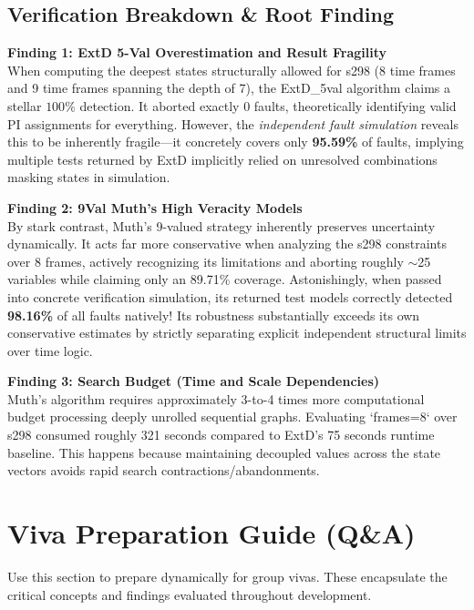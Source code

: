 \documentclass[12pt, a4paper]{article}
\begin{document}
\subsection{Verification Breakdown \& Root Finding}

\textbf{Finding 1: ExtD 5-Val Overestimation and Result Fragility} \\
When computing the deepest states structurally allowed for s298 (8 time frames and 9 time frames spanning the depth of 7), the ExtD\_5val algorithm claims a stellar $100\%$ detection. It aborted exactly 0 faults, theoretically identifying valid PI assignments for everything. However, the \textit{independent fault simulation} reveals this to be inherently fragile—it concretely covers only \textbf{95.59\%} of faults, implying multiple tests returned by ExtD implicitly relied on unresolved combinations masking states in simulation. 

\textbf{Finding 2: 9Val Muth's High Veracity Models} \\
By stark contrast, Muth's 9-valued strategy inherently preserves uncertainty dynamically. It acts far more conservative when analyzing the s298 constraints over 8 frames, actively recognizing its limitations and aborting roughly $\sim$25 variables while claiming only an 89.71\% coverage. Astonishingly, when passed into concrete verification simulation, its returned test models correctly detected \textbf{98.16\%} of all faults natively! Its robustness substantially exceeds its own conservative estimates by strictly separating explicit independent structural limits over time logic. 

\textbf{Finding 3: Search Budget (Time and Scale Dependencies)} \\
Muth's algorithm requires approximately 3-to-4 times more computational budget processing deeply unrolled sequential graphs. Evaluating `frames=8` over s298 consumed roughly 321 seconds compared to ExtD's 75 seconds runtime baseline. This happens because maintaining decoupled values across the state vectors avoids rapid search contractions/abandonments.

\newpage
\section{Viva Preparation Guide (Q\&A)}

Use this section to prepare dynamically for group vivas. These encapsulate the critical concepts and findings evaluated throughout development.
\end{document}
